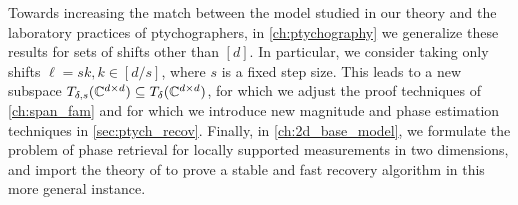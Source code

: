 Towards increasing the match between the model studied in our theory and the laboratory practices of ptychographers, in \cref{ch:ptychography} we generalize these results for sets of shifts other than $[d]$.  In particular, we consider taking only shifts $\ell = s k, k \in [d / s]$, where $s$ is a fixed step size.  This leads to a new subspace $T_{\delta, s}(\mathbb{C}^{d \times d}) \subseteq T_\delta(\mathbb{C}^{d \times d})$, for which we adjust the proof techniques of \cref{ch:span_fam} and for which we introduce new magnitude and phase estimation techniques in \cref{sec:ptych_recov}.  Finally, in \cref{ch:2d_base_model}, we formulate the problem of phase retrieval for locally supported measurements in two dimensions, and import the theory of  to prove a stable and fast recovery algorithm in this more general instance.
